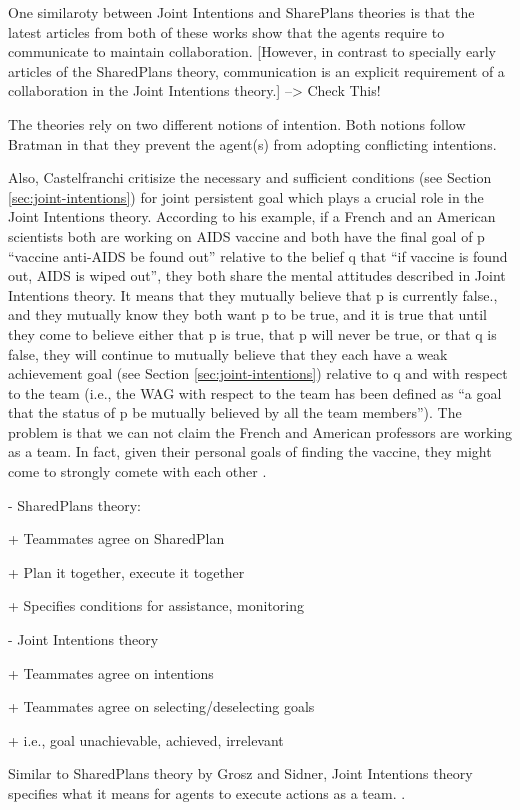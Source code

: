 \documentclass[11pt]{article}
\begin{document}
One similaroty between Joint Intentions and SharePlans theories is that the
latest articles from both of these works show that the agents require to
communicate to maintain collaboration. [However, in contrast to specially early
articles of the SharedPlans theory, communication is an explicit requirement of
a collaboration in the Joint Intentions theory.] --> Check This!

The theories rely on two different notions of intention. Both notions follow
Bratman in that they prevent the agent(s) from adopting conflicting intentions.

Also, Castelfranchi critisize the necessary and sufficient conditions (see
Section \ref{sec:joint-intentions}) for joint persistent goal which plays a
crucial role in the Joint Intentions theory. According to his example, if a
French and an American scientists both are working on AIDS vaccine and both
have the final goal of p ``vaccine anti-AIDS be found out'' relative to the
belief q that ``if vaccine is found out, AIDS is wiped out'', they both share
the mental attitudes described in Joint Intentions theory. It means that they
mutually  believe that p is currently false., and they mutually know they both
want p to be true, and it is true that until they come to believe either that p
is true, that p will never be true, or that q is false, they will continue to
mutually believe that they each have a weak achievement goal (see Section
\ref{sec:joint-intentions}) relative to q and with respect to the team (i.e.,
the WAG with respect to the team has been defined as ``a goal that the
status of p be mutually  believed by all the team members''). The problem is
that we can not claim the French and American professors are working as a team.
In fact, given their personal goals of finding the vaccine, they might come to
strongly comete with each other \cite{castelfranchi:commitments-aids}.

- SharedPlans theory:

+ Teammates agree on SharedPlan

+ Plan it together, execute it together

+ Specifies conditions for assistance, monitoring

- Joint Intentions theory

+ Teammates agree on intentions

+ Teammates agree on selecting/deselecting goals

+ i.e., goal unachievable, achieved, irrelevant

Similar to SharedPlans theory by Grosz and Sidner, Joint Intentions theory
specifies what it means for agents to execute actions as a team.
\cite{subramanian:joint-intention-dialogue}.
\end{document}
